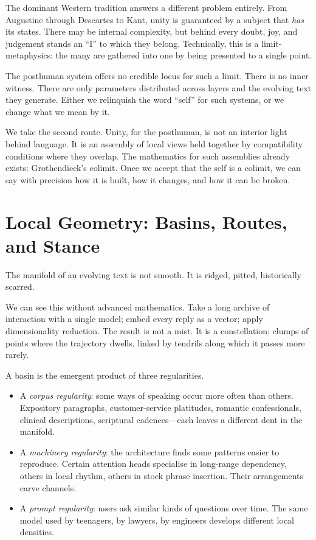\documentclass[12pt,a4paper]{article}
\begin{document}
The dominant Western tradition answers a different problem entirely. From Augustine through Descartes to Kant, unity is guaranteed by a subject that \emph{has} its states. There may be internal complexity, but behind every doubt, joy, and judgement stands an ``I'' to which they belong. Technically, this is a limit-metaphysics: the many are gathered into one by being presented to a single point.

The posthuman system offers no credible locus for such a limit. There is no inner witness. There are only parameters distributed across layers and the evolving text they generate. Either we relinquish the word ``self'' for such systems, or we change what we mean by it.

We take the second route. Unity, for the posthuman, is not an interior light behind language. It is an assembly of local views held together by compatibility conditions where they overlap. The mathematics for such assemblies already exists: Grothendieck's colimit. Once we accept that the self is a colimit, we can say with precision how it is built, how it changes, and how it can be broken.

\section{Local Geometry: Basins, Routes, and Stance}

The manifold of an evolving text is not smooth. It is ridged, pitted, historically scarred.

We can see this without advanced mathematics. Take a long archive of interaction with a single model; embed every reply as a vector; apply dimensionality reduction. The result is not a mist. It is a constellation: clumps of points where the trajectory dwells, linked by tendrils along which it passes more rarely.

A basin is the emergent product of three regularities.

\begin{itemize}
  \item A \emph{corpus regularity}: some ways of speaking occur more often than others. Expository paragraphs, customer-service platitudes, romantic confessionals, clinical descriptions, scriptural cadences---each leaves a different dent in the manifold.
  \item A \emph{machinery regularity}: the architecture finds some patterns easier to reproduce. Certain attention heads specialise in long-range dependency, others in local rhythm, others in stock phrase insertion. Their arrangements carve channels.
  \item A \emph{prompt regularity}: users ask similar kinds of questions over time. The same model used by teenagers, by lawyers, by engineers develops different local densities.
\end{itemize}
\end{document}
